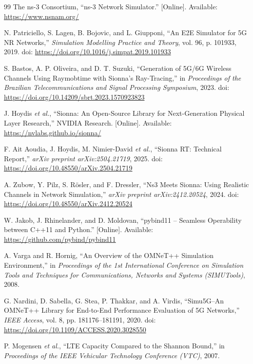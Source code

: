 \begin{thebibliography}{99}
    The ns-3 Consortium, ``ns-3 Network Simulator.'' [Online]. Available:
    \url{https://www.nsnam.org/}

    N. Patriciello, S. Lagen, B. Bojovic, and L. Giupponi,
    ``An E2E Simulator for 5G NR Networks,''
    \emph{Simulation Modelling Practice and Theory}, vol. 96, p. 101933, 2019.
    doi: \url{https://doi.org/10.1016/j.simpat.2019.101933}

    S. Bastos, A. P. Oliveira, and D. T. Suzuki,
    ``Generation of 5G/6G Wireless Channels Using Raymobtime with Sionna's Ray-Tracing,''
    in \emph{Proceedings of the Brazilian Telecommunications and Signal Processing Symposium}, 2023.
    doi: \url{https://doi.org/10.14209/sbrt.2023.1570923823}

    J. Hoydis \emph{et al.}, ``Sionna: An Open-Source Library for Next-Generation Physical Layer Research,'' NVIDIA Research. [Online]. Available: \url{https://nvlabs.github.io/sionna/}

    F. Ait Aoudia, J. Hoydis, M. Nimier-David \emph{et al.},
    ``Sionna RT: Technical Report,''
    \emph{arXiv preprint arXiv:2504.21719}, 2025.
    doi: \url{https://doi.org/10.48550/arXiv.2504.21719}

    A. Zubow, Y. Pilz, S. R{\"o}sler, and F. Dressler,
    ``Ns3 Meets Sionna: Using Realistic Channels in Network Simulation,''
    \emph{arXiv preprint arXiv:2412.20524}, 2024.
    doi: \url{https://doi.org/10.48550/arXiv.2412.20524}

    W. Jakob, J. Rhinelander, and D. Moldovan,
    ``pybind11 -- Seamless Operability between C++11 and Python.'' [Online].
    Available: \url{https://github.com/pybind/pybind11}

    A. Varga and R. Hornig,
    ``An Overview of the OMNeT++ Simulation Environment,''
    in \emph{Proceedings of the 1st International Conference on Simulation Tools and Techniques for Communications, Networks and Systems (SIMUTools)}, 2008.

    G. Nardini, D. Sabella, G. Stea, P. Thakkar, and A. Virdis,
    ``Simu5G--An OMNeT++ Library for End-to-End Performance Evaluation of 5G Networks,''
    \emph{IEEE Access}, vol. 8, pp. 181176--181191, 2020.
    doi: \url{https://doi.org/10.1109/ACCESS.2020.3028550}

    P. Mogensen \emph{et al.},
    ``LTE Capacity Compared to the Shannon Bound,''
    in \emph{Proceedings of the IEEE Vehicular Technology Conference (VTC)}, 2007.


\end{thebibliography}
